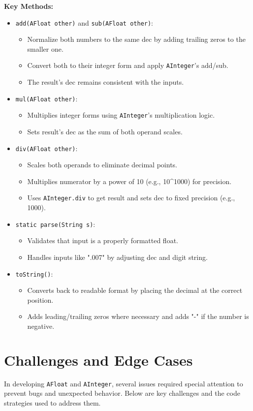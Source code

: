\documentclass[11pt]{article}
\begin{document}
\textbf{Key Methods:}
\begin{itemize}
  \item \texttt{add(AFloat other)} and \texttt{sub(AFloat other)}:
    \begin{itemize}
      \item Normalize both numbers to the same dec by adding trailing zeros to the smaller one.
      \item Convert both to their integer form and apply \texttt{AInteger}'s add/sub.
      \item The result's dec remains consistent with the inputs.
    \end{itemize}
  \item \texttt{mul(AFloat other)}:
    \begin{itemize}
      \item Multiplies integer forms using \texttt{AInteger}'s multiplication logic.
      \item Sets result's dec as the sum of both operand scales.
    \end{itemize}
  \item \texttt{div(AFloat other)}:
    \begin{itemize}
      \item Scales both operands to eliminate decimal points.
      \item Multiplies numerator by a power of 10 (e.g., 10\textasciicircum{}1000) for precision.
      \item Uses \texttt{AInteger.div} to get result and sets dec to fixed precision (e.g., 1000).
    \end{itemize}
  \item \texttt{static parse(String s)}:
    \begin{itemize}
      \item Validates that input is a properly formatted float.
      \item Handles inputs like ".007" by adjusting dec and digit string.
    \end{itemize}
  \item \texttt{toString()}:
    \begin{itemize}
      \item Converts back to readable format by placing the decimal at the correct position.
      \item Adds leading/trailing zeros where necessary and adds "-" if the number is negative.
    \end{itemize}
\end{itemize}
\section{Challenges and Edge Cases}
In developing \texttt{AFloat} and \texttt{AInteger}, several issues required special attention to prevent bugs and unexpected behavior. Below are key challenges and the code strategies used to address them.
\end{document}
